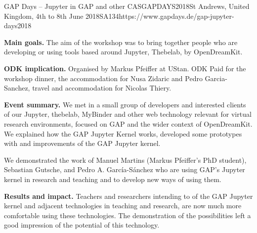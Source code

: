 \begin{event}{GAP Days -- Jupyter in GAP and other CAS}{GAPDAYS2018}{St Andrews, United Kingdom, 4th to 8th June 2018}{SA}{13}{4}{https://www.gapdays.de/gap-jupyter-days2018}

\textbf{Main goals.} The aim of the workshop was to bring together people who are developing or using tools based around Jupyter, Thebelab, by OpenDreamKit.

\textbf{ODK implication.} Organised by Markus Pfeiffer at UStan. ODK Paid for
the workshop dinner, the accommodation for Nusa Zidaric and Pedro
Garcia-Sanchez, travel and accommodation for Nicolas Thiery.

\textbf{Event summary.} We met in a small group of developers and interested
clients of our Jupyter, thebelab, MyBinder and other web technology relevant for
virtual research environments, focused on GAP and the wider context of
OpenDreamKit. We explained how the GAP Jupyter Kernel works, developed some
prototypes with and improvements of the GAP Jupyter kernel.

We demonstrated the work of Manuel Martins (Markus Pfeiffer's PhD student),
Sebastian Gutsche, and Pedro A. García-Sánchez who are using GAP's Jupyter
kernel in research and teaching and to develop new ways of using them.

\textbf{Results and impact.} Teachers and researchers intending to of the GAP
Jupyter kernel and adjacent technologies in teaching and research, are now much
more comfortable using these technologies. The demonstration of the
possibilities left a good impression of the potential of this technology.

\end{event}
